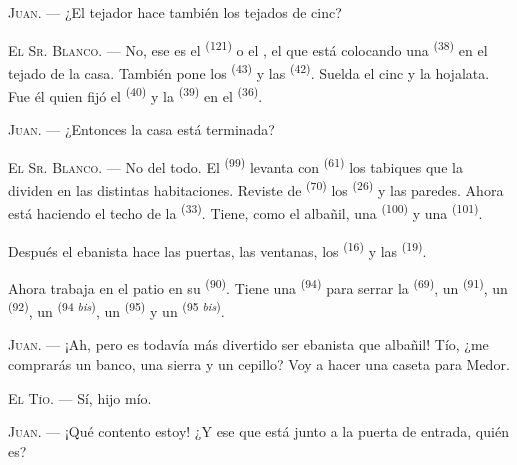 \textsc{Juan}. --- ¿El tejador hace también los tejados de cinc?

\textsc{El Sr. Blanco}. --- No, ese es el  \textsuperscript{(121)} o
el , el que está colocando una 
\textsuperscript{(38)} en el tejado de la casa. También pone los 
\textsuperscript{(43)} y las  \textsuperscript{(42)}. Suelda el cinc y la
hojalata. Fue él quien fijó el  \textsuperscript{(40)} y la
 \textsuperscript{(39)} en el  \textsuperscript{(36)}.

\textsc{Juan}. --- ¿Entonces la casa está terminada?

\VUsaut{3.0mm}
\VUsaut{3.0mm}

\textsc{El Sr. Blanco}. --- No del todo. El  \textsuperscript{(99)}
levanta con  \textsuperscript{(61)} los tabiques que la dividen en
las distintas habitaciones. Reviste de  \textsuperscript{(70)} los
 \textsuperscript{(26)} y las paredes. Ahora está haciendo el techo
de la  \textsuperscript{(33)}. Tiene, como el albañil, una
 \textsuperscript{(100)} y una  \textsuperscript{(101)}.

Después el ebanista hace las puertas, las ventanas, los
 \textsuperscript{(16)} y las 
\textsuperscript{(19)}.

Ahora trabaja en el patio en su  \textsuperscript{(90)}.
Tiene una  \textsuperscript{(94)} para serrar la 
\textsuperscript{(69)}, un  \textsuperscript{(91)}, un 
\textsuperscript{(92)}, un  \textsuperscript{(94 \textit{bis})}, un
 \textsuperscript{(95)} y un 
\textsuperscript{(95 \textit{bis})}.

\textsc{Juan}. --- ¡Ah, pero es todavía más divertido ser ebanista que
albañil! Tío, ¿me comprarás un banco, una sierra y un cepillo? Voy a
hacer una caseta para Medor.

\textsc{El Tío}. --- Sí, hijo mío.

\textsc{Juan}. --- ¡Qué contento estoy! ¿Y ese que está junto a la puerta
de entrada, quién es?

